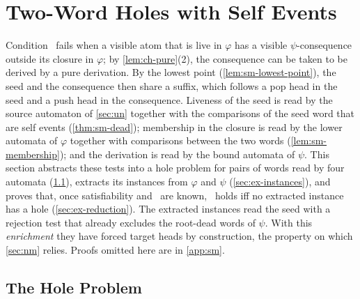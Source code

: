 
\section{Two-Word Holes with Self Events}\label{sec:ex}

Condition \CondII\ fails when a visible atom that is live in $\varphi$ has a
visible $\psi$-consequence outside its closure in $\varphi$; by
\cref{lem:ch-pure}(2), the consequence can be taken to be derived by a pure
derivation. By the lowest point (\cref{lem:sm-lowest-point}), the seed and the
consequence then share a suffix, which follows a pop head in the seed and a
push head in the consequence. Liveness of the seed is read by the source
automaton of \cref{sec:un} together with the comparisons of the seed word
that are self events (\cref{thm:sm-dead}); membership in the closure is read
by the lower automata of $\varphi$ together with comparisons between the two
words (\cref{lem:sm-membership}); and the derivation is read by the bound
automata of $\psi$. This section abstracts these tests into a hole problem
for pairs of words read by four automata (\cref{sec:ex-problem}), extracts its
instances from $\varphi$ and $\psi$ (\cref{sec:ex-instances}), and proves
that, once satisfiability and \CondU\ are known, \CondII\ holds iff no
extracted instance has a hole (\cref{sec:ex-reduction}). The extracted
instances read the seed with a rejection test that already excludes the
root-dead words of $\psi$. With this \emph{enrichment} they have forced target
heads by construction, the property on which \cref{sec:nm} relies. Proofs
omitted here are in \cref{app:sm}.

\subsection{The Hole Problem}\label{sec:ex-problem}

